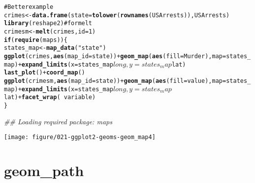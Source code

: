 \documentclass[a4paper,titlepage]{tufte-handout}\usepackage{graphicx, color}
\makeatletter
\def\maxwidth{ %
  \ifdim\Gin@nat@width>\linewidth
    \linewidth
  \else
    \Gin@nat@width
  \fi
}
\newcommand{\hlfunctioncall}[1]{\textcolor[rgb]{0.501960784313725,0,0.329411764705882}{\textbf{#1}}}%
\newcommand{\hlstring}[1]{\textcolor[rgb]{0.6,0.6,1}{#1}}%
\newcommand{\hlcomment}[1]{\textcolor[rgb]{0.180392156862745,0.6,0.341176470588235}{#1}}%
\newenvironment{kframe}{%
 \def\at@end@of@kframe{}%
 \ifinner\ifhmode%
  \def\at@end@of@kframe{\end{minipage}}%
  \begin{minipage}{\columnwidth}%
 \fi\fi%
 \def\FrameCommand##1{\hskip\@totalleftmargin \hskip-\fboxsep
 \colorbox{shadecolor}{##1}\hskip-\fboxsep
     \hskip-\linewidth \hskip-\@totalleftmargin \hskip\columnwidth}%
 \MakeFramed {\advance\hsize-\width
   \@totalleftmargin\z@ \linewidth\hsize
   \@setminipage}}%
 {\par\unskip\endMakeFramed%
 \at@end@of@kframe}
\newenvironment{knitrout}{}{} %
\makeatother
\begin{document}
\begin{knitrout}
\begin{kframe}
\begin{alltt}
\hlcomment{# Better example}
crimes <- \hlfunctioncall{data.frame}(state = \hlfunctioncall{tolower}(\hlfunctioncall{rownames}(USArrests)), USArrests)
\hlfunctioncall{library}(reshape2) \hlcomment{# for melt}
crimesm <- \hlfunctioncall{melt}(crimes, id = 1)
\hlfunctioncall{if} (\hlfunctioncall{require}(maps)) \{
  states_map <- \hlfunctioncall{map_data}(\hlstring{"state"})
  \hlfunctioncall{ggplot}(crimes, \hlfunctioncall{aes}(map_id = state)) + \hlfunctioncall{geom_map}(\hlfunctioncall{aes}(fill = Murder), map = states_map) + \hlfunctioncall{expand_limits}(x = states_map$long, y = states_map$lat)
  \hlfunctioncall{last_plot}() + \hlfunctioncall{coord_map}()
  \hlfunctioncall{ggplot}(crimesm, \hlfunctioncall{aes}(map_id = state)) + \hlfunctioncall{geom_map}(\hlfunctioncall{aes}(fill = value), map = states_map) + \hlfunctioncall{expand_limits}(x = states_map$long, y = states_map$lat) + \hlfunctioncall{facet_wrap}( ~ variable)
\}
\end{alltt}


{\ttfamily\noindent\itshape\textcolor{messagecolor}{\#\# Loading required package: maps}}\end{kframe}
\texttt{[image: figure/021-ggplot2-geoms-geom\_map4]} 
\begin{kframe}\begin{alltt}


\end{alltt}
\end{kframe}
\end{knitrout}



\section{geom\_path}
\end{document}
